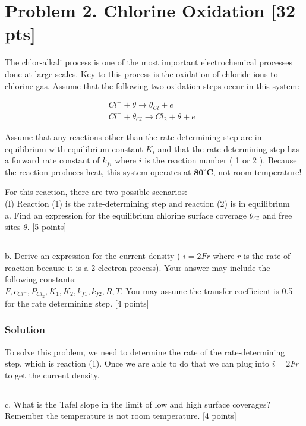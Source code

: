 \documentclass[12pt]{article}
\begin{document}
\section{Problem 2. Chlorine Oxidation [32 pts]}
The chlor-alkali process is one of the most important electrochemical processes done at large scales. Key to this process is the oxidation of chloride ions to chlorine gas. Assume that the following two oxidation steps occur in this system:


\begin{gather*}
C l^{-}+\theta \rightarrow \theta_{C l}+e^{-}  \tag{1}\\
C l^{-}+\theta_{C l} \rightarrow C l_{2}+\theta+e^{-} \tag{2}
\end{gather*}


Assume that any reactions other than the rate-determining step are in equilibrium with equilibrium constant $K_{i}$ and that the rate-determining step has a forward rate constant of $k_{f i}$ where $i$ is the reaction number ( 1 or 2 ). Because the reaction produces heat, this system operates at $\mathbf{8 0}^{\circ} \mathbf{C}$, not room temperature!

For this reaction, there are two possible scenarios:\\
(I) Reaction (1) is the rate-determining step and reaction (2) is in equilibrium\\
a. Find an expression for the equilibrium chlorine surface coverage $\theta_{C l}$ and free sites $\theta$. [5 points]\\
\subsection{}
b. Derive an expression for the current density ( $i=2 F r$ where $r$ is the rate of reaction because it is a 2 electron process). Your answer may include the following constants:\\
$F, c_{C l^{-}}, P_{C l_{2}}, K_{1}, K_{2}, k_{f 1}, k_{f 2}, R, T$. You may assume the transfer coefficient is 0.5 for the rate determining step. [4 points]\\[0pt]
\subsubsection{Solution}
To solve this problem, we need to determine the rate of the rate-determining step, which is reaction (1). Once we are able to do that we can plug into $i=2 F r$ to get the current density.
\subsection{}
c. What is the Tafel slope in the limit of low and high surface coverages? Remember the temperature is not room temperature. [4 points]\\
\end{document}
